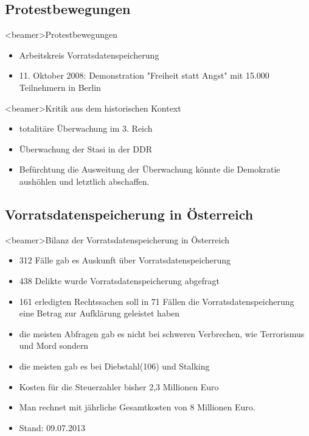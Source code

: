       \subsection{Protestbewegungen}
    \begin{frame}<beamer>{Protestbewegungen}
       \begin{itemize}
        \item Arbeitskreis Vorratsdatenspeicherung
        \item 11. Oktober 2008: Demonstration "Freiheit statt Angst" mit 15.000 Teilnehmern in Berlin
      \end{itemize}
    \end{frame}
        \begin{frame}<beamer>{Kritik aus dem historischen Kontext}
       \begin{itemize}
        \item totalitäre Überwachung im 3. Reich
        \item Überwachung der Stasi in der DDR
        \item Befürchtung die Ausweitung der Überwachung könnte die Demokratie aushöhlen und letztlich abschaffen.
      \end{itemize}
    \end{frame}
    
          \subsection{Vorratsdatenspeicherung in Österreich}
    \begin{frame}<beamer>{Bilanz der Vorratsdatenspeicherung in Österreich}
        \begin{itemize}
        \item 312 Fälle gab es Auskunft über Vorratsdatenspeicherung
        \item 438 Delikte wurde Vorratsdatenspeicherung abgefragt
        \item 161 erledigten Rechtssachen soll in 71 Fällen die Vorratsdatenspeicherung eine Betrag zur Aufklärung geleistet haben
        \item die meisten Abfragen gab es nicht bei schweren Verbrechen, wie Terrorismus und Mord sondern
        \item die meisten gab es bei Diebstahl(106) und Stalking
        \item Kosten für die Steuerzahler bisher 2,3 Millionen Euro
        \item Man rechnet mit jährliche Gesamtkosten von 8 Millionen Euro.
        \item Stand: 09.07.2013 
         \end{itemize}
    \end{frame}

    
    


